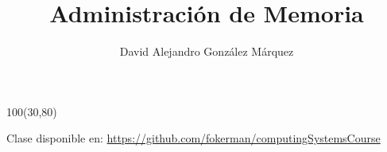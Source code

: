 \documentclass[aspectratio=169]{beamer}
\title{\Huge Administración de Memoria}
\author{David Alejandro González Márquez}
\date{}
\begin{document}
\begin{frame}[plain]
    \titlepage
    \begin{textblock}{100}(30,80)
    \begin{tcolorbox}[size=small,width=\textwidth,colback={gray!30},title={}]
    \begin{center}
     \scriptsize Clase disponible en: \url{https://github.com/fokerman/computingSystemsCourse}
    \end{center}
    \end{tcolorbox}
    \end{textblock}
\end{frame}
\end{document}
